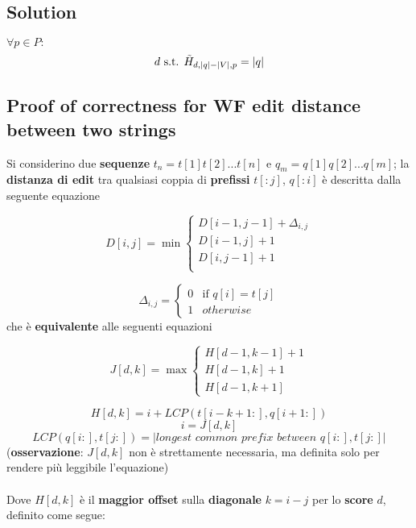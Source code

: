 \documentclass{article}
\begin{document}
\subsection{Solution}
$\forall p \in P:$
\begin{equation}
    d \text{ s.t. } \Tilde{H}_{d, \lvert q \rvert - \lvert V \rvert, p} = \lvert q \rvert
\end{equation}

\subsection{Proof of correctness for WF edit distance between two strings}
    
Si considerino due \textbf{sequenze} $t_n = t[1]t[2]...t[n]$ e $q_m = q[1]q[2]...q[m]$; la \textbf{distanza di edit} tra qualsiasi coppia di \textbf{prefissi} $t[:j]$, $q[:i]$ è descritta dalla seguente equazione

\begin{equation}
    D[i,j] = \min \begin{cases}
        D[i-1,j-1] + \Delta_{i,j} \\
        D[i-1,j] + 1 \\
        D[i,j-1] + 1 \\
    \end{cases}
\end{equation}

$$\Delta_{i,j} = \begin{cases}
    0 & \text{if }q[i] = t[j] \\
    1 & otherwise
\end{cases}$$
che è \textbf{equivalente} alle seguenti equazioni

\begin{equation}
    J[d,k] = \max \begin{cases}
        H[d-1, k-1] + 1 \\
        H[d-1, k] + 1 \\
        H[d-1, k + 1]
    \end{cases}       
\end{equation}
    
\begin{equation}
    H[d, k] = i + LCP(t[i - k + 1:], q[i + 1:])
\end{equation}
$$i = J[d, k]$$
$$LCP(q[i:], t[j:]) = \lvert \textit{longest common prefix between } q[i:], t[j:] \rvert$$
(\textbf{osservazione}: $J[d,k]$ non è strettamente necessaria, ma definita solo per rendere più leggibile l'equazione) 
\\
\\
Dove $H[d, k]$ è il \textbf{maggior offset} sulla \textbf{diagonale} $k = i - j$ per lo \textbf{score} $d$, definito come segue:
\end{document}

